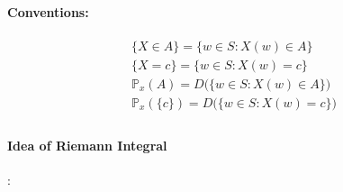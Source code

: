\documentclass[10pt,a4paper]{article}
\theoremstyle{definition}
\theoremstyle{plain}
\begin{document}
\paragraph{Conventions:}
\begin{eqnarray*}
\{ X \in A \} = \{w \in S: X(w) \in A \}\\
\{X = c\} = \{w \in S: X(w) = c\}\\
\mathbb{P}_x(A) = D\big(\{w \in S: X(w) \in A\}\big)\\
\mathbb{P}_x(\{c\}) = D\big(\{w \in S: X(w) = c\}\big)\\	
\end{eqnarray*}

\paragraph{Idea of Riemann Integral}:
\end{document}
